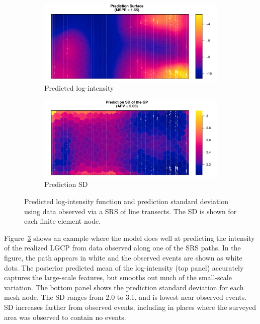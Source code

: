 \documentclass[review]{elsarticle}
\begin{document}
\begin{figure}

\begin{subfigure}{5in}
\includegraphics[width=5in]{../graphics/lambda-SRS000187-LGCP000004.pdf}
\caption{Predicted log-intensity}
\label{lambdasrs000187}
\end{subfigure}

\begin{subfigure}{5in}
\includegraphics[width=5in]{../graphics/lambdaSD-SRS000187-LGCP000004.pdf}
\caption{Prediction SD}
\label{sdsrs000187}
\end{subfigure}

\caption{Predicted log-intensity function and prediction standard deviation
using data observed via a SRS of line transects. The SD is shown for each
finite element node.}
\label{srs000187}
\end{figure}

Figure~\ref{srs000187} shows an example where the model does well at predicting
the intensity of the realized LGCP from data observed along one of the SRS
paths. In the figure, the path appears in white and the observed events are
shown as white dots. The posterior predicted mean of the log-intensity (top
panel) accurately captures the large-scale features, but smooths out much of
the small-scale variation. The bottom panel shows the prediction standard
deviation for each mesh node. The SD ranges from 2.0 to 3.1, and is lowest
near observed events. SD increases farther from observed events, including
in places where the surveyed area was observed to contain no events.
\end{document}
